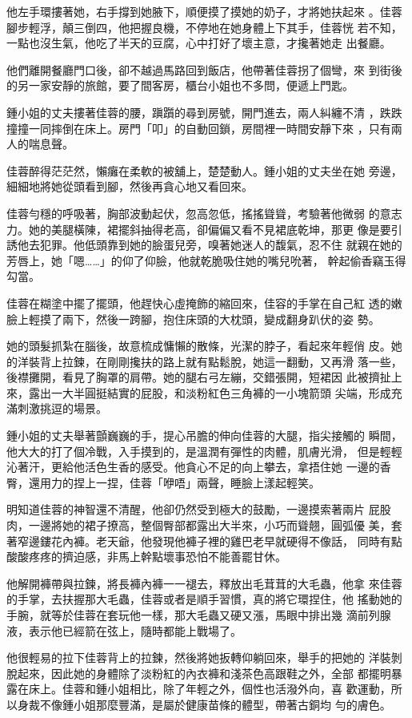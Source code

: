 他左手環摟著她，右手撐到她腋下，順便摸了摸她的奶子，才將她扶起來
。佳蓉腳步輕浮，顛三倒四，他把握良機，不停地在她身體上下其手，佳蓉恍
若不知，一點也沒生氣，他吃了半天的豆腐，心中打好了壞主意，才攙著她走
出餐廳。

他們離開餐廳門口後，卻不越過馬路回到飯店，他帶著佳蓉拐了個彎，來
到街後的另一家安靜的旅館，要了間客房，櫃台小姐也不多問，便遞上門匙。

鍾小姐的丈夫摟著佳蓉的腰，蹎躓的尋到房號，開門進去，兩人糾纏不清
，跌跌撞撞一同摔倒在床上。房門「叩」的自動回鎖，房間裡一時間安靜下來
，只有兩人的喘息聲。

佳蓉醉得茫茫然，懶癱在柔軟的被舖上，楚楚動人。鍾小姐的丈夫坐在她
旁邊，細細地將她從頭看到腳，然後再貪心地又看回來。

佳蓉勻穩的呼吸著，胸部波動起伏，忽高忽低，搖搖聳聳，考驗著他微弱
的意志力。她的美腿橫陳，裙擺斜抽得老高，卻偏偏又看不見裙底乾坤，那更
像是要引誘他去犯罪。他低頭靠到她的臉蛋兒旁，嗅著她迷人的馥氣，忍不住
就親在她的芳唇上，她「嗯……」的仰了仰臉，他就乾脆吸住她的嘴兒吮著，
幹起偷香竊玉得勾當。

佳蓉在糊塗中擺了擺頭，他趕快心虛掩飾的縮回來，佳容的手掌在自己紅
透的嫩臉上輕摸了兩下，然後一跨腳，抱住床頭的大枕頭，變成翻身趴伏的姿
勢。

她的頭髮抓紮在腦後，故意梳成慵懶的散條，光潔的脖子，看起來年輕俏
皮。她的洋裝背上拉鍊，在剛剛攙扶的路上就有點鬆脫，她這一翻動，又再滑
落一些，後襟攤開，看見了胸罩的肩帶。她的腿右弓左繃，交錯張開，短裙因
此被擠扯上來，露出一大半圓挺結實的屁股，和淡粉紅色三角褲的一小塊箭頭
尖端，形成充滿刺激挑逗的場景。

鍾小姐的丈夫舉著顫巍巍的手，提心吊膽的伸向佳蓉的大腿，指尖接觸的
瞬間，他大大的打了個冷戰，入手摸到的，是溫潤有彈性的肉體，肌膚光滑，
但是輕輕沁著汗，更給他活色生香的感受。他貪心不足的向上攀去，拿捂住她
一邊的香臀，還用力的捏上一捏，佳蓉「咿唔」兩聲，睡臉上漾起輕笑。

明知道佳蓉的神智還不清醒，他卻仍然受到極大的鼓勵，一邊摸索著兩片
屁股肉，一邊將她的裙子撩高，整個臀部都露出大半來，小巧而聳翹，圓弧優
美，套著窄邊鏤花內褲。老天爺，他發現他褲子裡的雞巴老早就硬得不像話，
同時有點酸酸疼疼的擠迫感，非馬上幹點壞事恐怕不能善罷甘休。

他解開褲帶與拉鍊，將長褲內褲一一褪去，釋放出毛茸茸的大毛蟲，他拿
來佳蓉的手掌，去扶握那大毛蟲，佳蓉或者是順手習慣，真的將它環捏住，他
搖動她的手腕，就等於佳蓉在套玩他一樣，那大毛蟲又硬又漲，馬眼中排出幾
滴前列腺液，表示他已經箭在弦上，隨時都能上戰場了。

他很輕易的拉下佳蓉背上的拉鍊，然後將她扳轉仰躺回來，舉手的把她的
洋裝剝脫起來，因此她的身體除了淡粉紅的內衣褲和淺茶色高跟鞋之外，全部
都擺明暴露在床上。佳蓉和鍾小姐相比，除了年輕之外，個性也活潑外向，喜
歡運動，所以身裁不像鍾小姐那麼豐滿，是屬於健康苗條的體型，帶著古銅均
勻的膚色。

